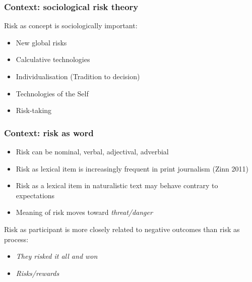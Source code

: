 \documentclass{beamer}       %
\begin{document}
\begin{frame}
    \frametitle{Context: sociological risk theory}
    
    Risk as concept is sociologically important:

    \begin{itemize}
        \item New global risks \cite{beck_risk_1992}
        \item Calculative technologies \cite{dean_governmentality:_1999}
        \item Individualisation (Tradition to decision)
        \item Technologies of the Self \cite{dean_risk_1998}
        \item Risk-taking \cite{luhmann_risk:_1993}
    \end{itemize}

\end{frame}

\begin{frame}\frametitle{Context: risk as word}
\begin{itemize} 
    \item Risk can be nominal, verbal, adjectival, adverbial
    \item Risk as lexical item is increasingly frequent in print journalism (Zinn 2011)
    \item Risk as a lexical item in naturalistic text may behave contrary to expectations \cite{hamilton_meanings_2007}
    \item Meaning of risk moves toward \emph{threat\slash danger}
\end{itemize}
Risk as participant is more closely related to negative outcomes than risk as process:
\begin{itemize}
    \item \emph{They risked it all and won}
    \item \emph{Risks\slash rewards}
\end{itemize}
\end{frame}
\end{document}
